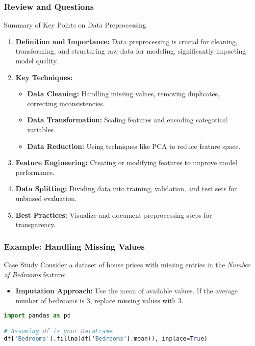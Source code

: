 \documentclass[aspectratio=169]{beamer}
\begin{document}
\begin{frame}[fragile]
    \frametitle{Review and Questions}
    
    \begin{block}{Summary of Key Points on Data Preprocessing}
        \begin{enumerate}
            \item \textbf{Definition and Importance:} 
            Data preprocessing is crucial for cleaning, transforming, and structuring raw data for modeling, significantly impacting model quality.
            
            \item \textbf{Key Techniques:}
            \begin{itemize}
                \item \textbf{Data Cleaning:} Handling missing values, removing duplicates, correcting inconsistencies.
                \item \textbf{Data Transformation:} Scaling features and encoding categorical variables.
                \item \textbf{Data Reduction:} Using techniques like PCA to reduce feature space.
            \end{itemize}
            
            \item \textbf{Feature Engineering:} Creating or modifying features to improve model performance.
            
            \item \textbf{Data Splitting:} Dividing data into training, validation, and test sets for unbiased evaluation.
            
            \item \textbf{Best Practices:} Visualize and document preprocessing steps for transparency.
        \end{enumerate}
    \end{block}
\end{frame}

\begin{frame}[fragile]
    \frametitle{Example: Handling Missing Values}
    
    \begin{block}{Case Study}
        Consider a dataset of house prices with missing entries in the \textit{Number of Bedrooms} feature:
        \begin{itemize}
            \item \textbf{Imputation Approach:} Use the mean of available values. If the average number of bedrooms is 3, replace missing values with 3.
        \end{itemize}
    \end{block}
    
    \begin{lstlisting}[language=Python]
import pandas as pd

# Assuming df is your DataFrame
df['Bedrooms'].fillna(df['Bedrooms'].mean(), inplace=True)
    \end{lstlisting}
\end{frame}
\end{document}
